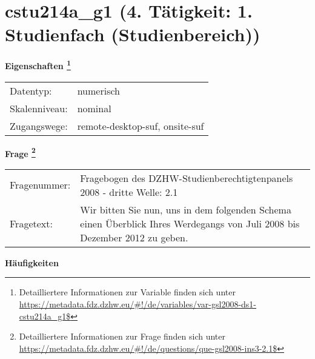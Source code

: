
    \setcounter{footnote}{0}

    \vspace*{-1.8cm}
	\section{cstu214a\_g1 (4. Tätigkeit: 1. Studienfach (Studienbereich))}
	\label{section:cstu214a_g1}



    \vspace*{0.5cm}
    \noindent\textbf{Eigenschaften
	\footnote{Detailliertere Informationen zur Variable finden sich unter
		\url{https://metadata.fdz.dzhw.eu/\#!/de/variables/var-gsl2008-ds1-cstu214a_g1$}}}\\
	\begin{tabularx}{\hsize}{@{}lX}
	Datentyp: & numerisch \\
	Skalenniveau: & nominal \\
	Zugangswege: &
	  remote-desktop-suf, 
	  onsite-suf
 \\
    \end{tabularx}



				\vspace*{0.5cm}
                \noindent\textbf{Frage
	                \footnote{Detailliertere Informationen zur Frage finden sich unter
		              \url{https://metadata.fdz.dzhw.eu/\#!/de/questions/que-gsl2008-ins3-2.1$}}}\\
				\begin{tabularx}{\hsize}{@{}lX}
					Fragenummer: &
					  Fragebogen des DZHW-Studienberechtigtenpanels 2008 - dritte Welle:
					  2.1
 \\
					Fragetext: & Wir bitten Sie nun, uns in dem folgenden Schema einen Überblick Ihres Werdegangs von Juli 2008 bis Dezember 2012 zu geben. \\
				\end{tabularx}





        		\vspace*{0.5cm}
                \noindent\textbf{Häufigkeiten}

